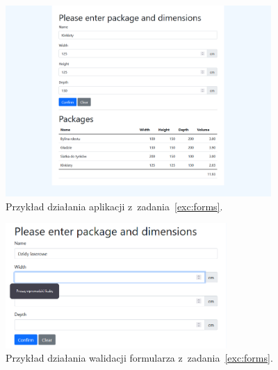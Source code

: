 \documentclass[12pt]{article}
\begin{document}
\begin{enumerate}
            \begin{figure}[p]
                \centering
                \includegraphics[width=0.9\textwidth]{lista-2-2}
                \caption{Przykład działania aplikacji z~zadania~\ref{exc:forms}.}
                \label{fig:forms}
            \end{figure}

            \begin{figure}[p]
                \centering
                \includegraphics[width=0.75\textwidth]{lista-2-2-blad}
                \caption{Przykład działania walidacji formularza z~zadania~\ref{exc:forms}.}
                \label{fig:forms-error}
            \end{figure}

    \end{enumerate}
\end{document}

